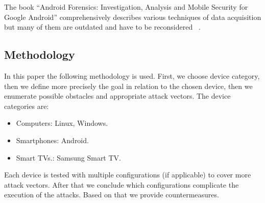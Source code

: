 The book “Android Forensics: Investigation, Analysis and Mobile Security for Google Android” comprehensively describes various techniques of data acquisition but many of them are outdated and have to be reconsidered ~\cite{book1}.


\subsection{Methodology}

In this paper the following methodology is used. First, we choose device category,  then we define more precisely the goal in relation to the chosen device, then we enumerate possible obstacles and appropriate attack vectors. The device categories are:

\begin{itemize}
\item Computers: Linux, Windows.
\item Smartphones: Android.
\item Smart TVs.: Samsung Smart TV.
\end{itemize}

Each device is tested with multiple configurations (if applicable) to cover more attack vectors. After that we conclude which configurations complicate the execution of the attacks. Based on that we provide countermeasures.
